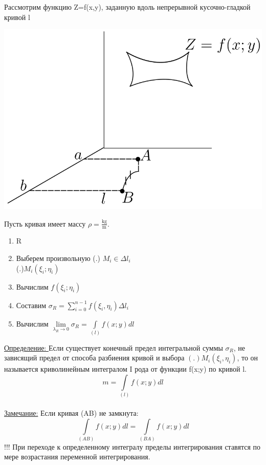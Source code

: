 \documentclass[12pt]{article}
\let\ORIincludegraphics\includegraphics
\renewcommand{\includegraphics}[2][]{\ORIincludegraphics[scale=0.65,#1]{#2}}
\let\oldint\int
\let\oldsum\sum
\let\oldlim\lim
\renewcommand{\int}{\oldint\limits}
\renewcommand{\sum}{\oldsum\limits}
\renewcommand{\lim}{\oldlim\limits}
\begin{document}
  \vspace{1em}
  \par Рассмотрим функцию Z=f(x,y), заданную вдоль непрерывной кусочно-гладкой кривой l\\

  \begin{minipage}{0.45\textwidth}
    \includegraphics[scale=0.6]{8.1.2.png}
  \end{minipage}
  \hspace{1em} 
  \begin{minipage}{0.65\textwidth} 
      Пусть кривая имеет массу $\rho=\frac{\mathrm{kg}}{\mathrm{m}}$.
      \begin{enumerate}
        \item R
        \item Выберем произвольную (.) $M_i \in \Delta l_i$\\ (.)$M_i (\xi_i;\eta_i)$
        \item Вычислим $f(\xi_i;\eta_i)$
        \item Составим $\sigma_R = \sum_{i=0}^{n-1} f(\xi_i,\eta_i) \Delta l_i$
        \item Вычислим $\lim_{\lambda_R \to 0} \sigma_R = \int_{(l)} f(x;y) dl$
      \end{enumerate}
  \end{minipage}
  \vspace{1em}
  \par
  \underline{Определение: } Если существует конечный предел интегральной суммы $\sigma_R$, не 
  зависящий предел от способа разбиения кривой и выбора $(.) M_i(\xi_i,\eta_i)$, то он называется
  криволинейным интегралом I рода от функции f(x;y) по кривой l.\\
  \[m=\int_{(l)} f(x;y) dl\]\\
  \underline{Замечание:} Если кривая (AB) не замкнута: \[\int_{(AB)} f(x;y)dl = \int_{(BA)} f(x;y)dl\]
  !!! При переходе к определенному интегралу пределы интегрирования ставятся по мере возрастания
  переменной интегрирования.
\end{document}
